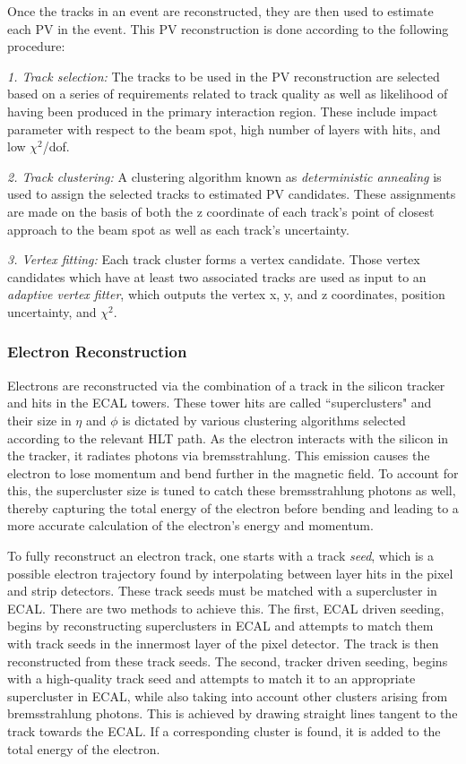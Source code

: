 Once the tracks in an event are reconstructed, they are then used to estimate each PV in the event. This PV reconstruction is done according to the following procedure\cite{TrackReco}:


\noindent\emph{1. Track selection:} The tracks to be used in the PV reconstruction are selected based on a series of requirements related to track quality as well as likelihood of having been produced in the primary interaction region. These include impact parameter with respect to the beam spot, high number of layers with hits, and low $\chi^2$/dof.


\noindent\emph{2. Track clustering:} A clustering algorithm known as \textit{deterministic annealing} is used to assign the selected tracks to estimated PV candidates. These assignments are made on the basis of both the z coordinate of each track's point of closest approach to the beam spot as well as each track's uncertainty.


\noindent\emph{3. Vertex fitting:} Each track cluster forms a vertex candidate. Those vertex candidates which have at least two associated tracks are used as input to an \textit{adaptive vertex fitter}\cite{AdaptiveVertexFitter}, which outputs the vertex x, y, and z coordinates, position uncertainty, and $\chi^2$.


\subsubsection{Electron Reconstruction}

Electrons are reconstructed via the combination of a track in the silicon tracker and hits in the ECAL towers. These tower hits are called ``superclusters" and their size in $\eta$ and $\phi$ is dictated by various clustering algorithms selected according to the relevant HLT path. As the electron interacts with the silicon in the tracker, it radiates photons via bremsstrahlung. This emission causes the electron to lose momentum and bend further in the magnetic field. To account for this, the supercluster size is tuned to catch these bremsstrahlung photons as well, thereby capturing the total energy of the electron before bending and leading to a more accurate calculation of the electron's energy and momentum. 

To fully reconstruct an electron track, one starts with a track \emph{seed}, which is a possible electron trajectory found by interpolating between layer hits in the pixel and strip detectors. These track seeds must be matched with a supercluster in ECAL. There are two methods to achieve this. The first, ECAL driven seeding, begins by reconstructing superclusters in ECAL and attempts to match them with track seeds in the innermost layer of the pixel detector. The track is then reconstructed from these track seeds. The second, tracker driven seeding, begins with a high-quality track seed and attempts to match it to an appropriate supercluster in ECAL, while also taking into account other clusters arising from bremsstrahlung photons. This is achieved by drawing straight lines tangent to the track towards the ECAL. If a corresponding cluster is found, it is added to the total energy of the electron.

